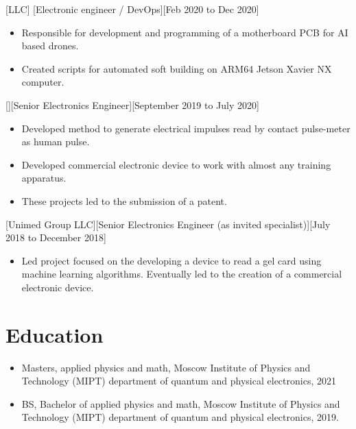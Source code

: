 \documentclass{article}
\begin{document}
 
[LLC]
[Electronic engineer / DevOps][Feb 2020 to Dec 2020]
 
\begin{itemize}
\item Responsible for development and programming of a motherboard PCB for AI based drones.
\item Created scripts for automated soft building on ARM64 Jetson Xavier NX computer.
\end{itemize}
 
 
[][Senior Electronics Engineer][September 2019 to July 2020]
 
\begin{itemize}
\item Developed method to generate electrical impulses read by contact pulse-meter as human pulse.
\item Developed commercial electronic device to work with almost any training apparatus.
\item These projects led to the submission of a patent.
\end{itemize}
 
[Unimed Group LLC][Senior Electronics Engineer (as invited specialist)][July 2018 to December 2018]
 
\begin{itemize}
\item Led project focused on the developing a device to read a gel card using machine learning algorithms. Eventually led to the creation of a commercial electronic device.
\end{itemize}
 
 
\section{Education}
 
\begin{itemize}
\item Masters, applied physics and math, Moscow Institute of Physics and Technology (MIPT) department of quantum and physical electronics, 2021
\item BS, Bachelor of applied physics and math, Moscow Institute of Physics and Technology (MIPT) department of quantum and physical electronics, 2019.
\end{itemize}
 
\end{document}

